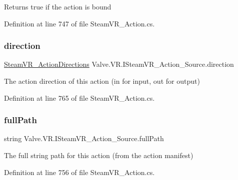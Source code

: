 Returns true if the action is bound 



Definition at line 747 of file Steam\+V\+R\+\_\+\+Action.\+cs.

\mbox{\label{interface_valve_1_1_v_r_1_1_i_steam_v_r___action___source_ad1fb56d52a28f0c621007a6b3ea7a71b}} 
\subsubsection{\texorpdfstring{direction}{direction}}
{\footnotesize\ttfamily \mbox{\hyperlink{namespace_valve_1_1_v_r_a1e6192cb5ddaf204afab87ccb5728780}{Steam\+V\+R\+\_\+\+Action\+Directions}} Valve.\+V\+R.\+I\+Steam\+V\+R\+\_\+\+Action\+\_\+\+Source.\+direction\hspace{0.3cm}{\ttfamily [get]}}



The action direction of this action (in for input, out for output) 



Definition at line 765 of file Steam\+V\+R\+\_\+\+Action.\+cs.

\mbox{\label{interface_valve_1_1_v_r_1_1_i_steam_v_r___action___source_aecfcecacdabb3ca489a137a30f9b1728}} 
\subsubsection{\texorpdfstring{fullPath}{fullPath}}
{\footnotesize\ttfamily string Valve.\+V\+R.\+I\+Steam\+V\+R\+\_\+\+Action\+\_\+\+Source.\+full\+Path\hspace{0.3cm}{\ttfamily [get]}}



The full string path for this action (from the action manifest) 



Definition at line 756 of file Steam\+V\+R\+\_\+\+Action.\+cs.

